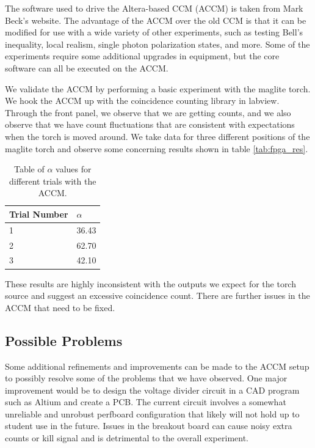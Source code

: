 \documentclass[letterpaper, 11 pt]{article}
\begin{document}
The software used to drive the Altera-based CCM (ACCM) is taken from Mark Beck's
website. The advantage of the ACCM over the old CCM is that it can be modified for use
with a wide variety of other experiments, such as testing Bell's inequality, local realism, single
photon polarization states, and more. Some of the experiments require some additional upgrades
in equipment, but the core software can all be executed on the ACCM.

We validate the ACCM by performing a basic experiment with the maglite torch.
We hook the ACCM up with the coincidence counting library in labview. Through the front panel,
we observe that we are getting counts, and we also observe that we have count fluctuations that
are consistent with expectations when the torch is moved around. We take data for three different positions
of the maglite torch and observe some concerning results shown in table \ref{tab:fpga_res}.
\begin{table}[H]
    \centering
    \begin{tabular}{|l|l|}
    \hline
    \textbf{Trial Number} & \textbf{$\alpha$} \\ \hline
    1   & 36.43                  \\ \hline
    2        & 62.70                   \\ \hline
    3        & 42.10                   \\ \hline
    \end{tabular}
    \caption{Table of $\alpha$ values for different trials with the ACCM.}
\end{table}\label{tab:fpga_res}
These results are highly inconsistent with the outputs we expect for the torch source
and suggest an excessive coincidence count. There are further issues in the ACCM that need to be fixed.

\subsection{Possible Problems}

Some additional refinements and improvements can be made to the ACCM setup to possibly
resolve some of the problems that we have observed. One major improvement would be to
design the voltage divider circuit in a CAD program such as Altium and create a PCB.
The current circuit involves a somewhat unreliable and unrobust perfboard configuration that
likely will not hold up to student use in the future. Issues in the
breakout board can cause noisy extra counts or kill signal and is detrimental to the overall experiment.
\end{document}
